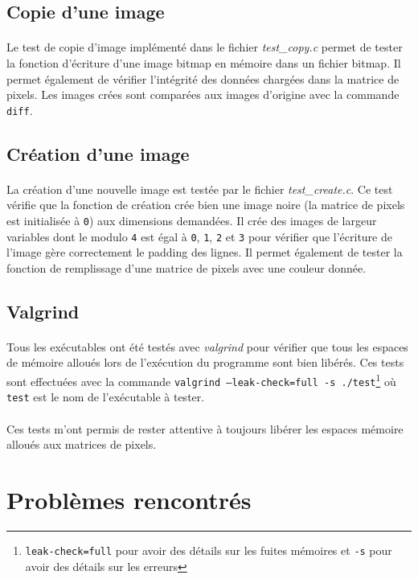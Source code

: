 \documentclass{article}
\begin{document}
    \subsection{Copie d'une image}
    \paragraph{}
    Le test de copie d'image implémenté dans le fichier \emph{test\_copy.c} permet de tester la fonction d'écriture d'une image bitmap en mémoire dans un fichier bitmap. Il permet également de vérifier l'intégrité des données chargées dans la matrice de pixels. Les images crées sont comparées aux images d'origine avec la commande \texttt{diff}.


    \subsection{Création d'une image}
    \paragraph{}
    La création d'une nouvelle image est testée par le fichier \emph{test\_create.c}. Ce test vérifie que la fonction de création crée bien une image noire (la matrice de pixels est initialisée à \texttt{0}) aux dimensions demandées. Il crée des images de largeur variables dont le modulo \texttt{4} est égal à \texttt{0}, \texttt{1}, \texttt{2} et \texttt{3} pour vérifier que l'écriture de l'image gère correctement le padding des lignes. Il permet également de tester la fonction de remplissage d'une matrice de pixels avec une couleur donnée.


    \subsection{Valgrind}
    \paragraph{}
    Tous les exécutables ont été testés avec \emph{valgrind} pour vérifier que tous les espaces de mémoire alloués lors de l'exécution du programme sont bien libérés. Ces tests sont effectuées avec la commande \texttt{valgrind --leak-check=full -s ./test}\footnote{\texttt{leak-check=full} pour avoir des détails sur les fuites mémoires et \texttt{-s} pour avoir des détails sur les erreurs} où \texttt{test} est le nom de l'exécutable à tester.

    \paragraph{}
    Ces tests m'ont permis de rester attentive à toujours libérer les espaces mémoire alloués aux matrices de pixels.



    \newpage
    \section{Problèmes rencontrés}

    
\end{document}

